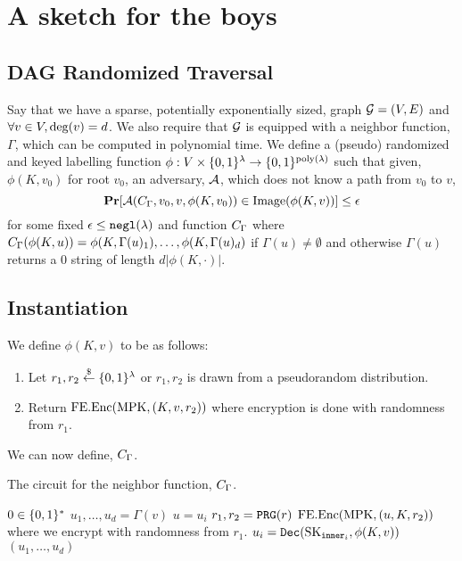 \section{A sketch for the boys}
\newcommand{\labelFunc}{\phi}
\newcommand{\imageFn}{\text{Image}}

\subsection{DAG Randomized Traversal}
Say that we have a sparse, potentially exponentially sized, graph $\mathcal{G} = (V, E)$
and $\forall v \in V, \deg(v) = d$.
We also require that $\mathcal{G}$ is equipped with a neighbor function, $\Gamma$, which can be computed in polynomial time.
We define a (pseudo) randomized and keyed labelling function $\phi: V \times \{0,1\}^\lambda \rightarrow \{0,1\}^{\operatorname{poly}(\lambda)}$ 
such that given, $\phi(K, v_0)$ for root $v_0$, an adversary, $\mathcal{A}$, which does not know a path from $v_0$ to $v$,
\begin{equation}
	\label{eq:guessPhi}
	\Pr[\advers(\circNeigb, v_0, v, \labelFunc(K, v_0)) \in \imageFn(\labelFunc(K, v))] \leq \eps
\end{equation}
for some fixed $\epsilon \leq \texttt{negl}(\lambda)$ and function $C_\Gamma$ where $\circNeigb(\labelFunc(K, u)) = \labelFunc(K, \Gamma(u)_1), \dots, \labelFunc(K, \Gamma(u)_d)$
if $\Gamma(u) \neq \emptyset$ and otherwise $\Gamma(u)$ returns a $0$ string of length $d |\labelFunc(K, \cdot)|$.

\subsection{Instantiation}
We define $\labelFunc(K, v)$ to be as follows:
\begin{enumerate}
	\item Let $r_1, r_2 \overset{\$}{\gets} \{0,1\}^\lambda$ or $r_1, r_2$ is drawn from a pseudorandom distribution. %
	\item Return $\text{FE.Enc}(\text{MPK}, (K, v, r_2))$ where encryption is done with randomness from $r_1$.
\end{enumerate}

We can now define, $C_\Gamma$.
\begin{algorithm}[H]
	\caption{
		The circuit for the neighbor function, $C_\Gamma$.
	}
	\begin{algorithmic}[1]
				\State \Return $0 \in \{0,1\}^*$ %
			\EndIf
			\State $u_1, \dots, u_d = \Gamma(v)$
			\State $u = u_i$
			\State $r_1, r_2 = \texttt{PRG}(r)$
			\label{alg:neighb:prg}
			\State \Return $\text{FE.Enc}(\text{MPK}, (u, K, r_2))$ where we encrypt with randomness from $r_1$.
		\EndFunction
				\State $u_i = \texttt{Dec}(\text{SK}_{\texttt{inner}_i}, \phi(K, v))$
			\EndFor
			\State \Return $(u_1, \dots, u_d)$
		\EndFunction
	\end{algorithmic}
	\label{alg:neighb}
\end{algorithm}


